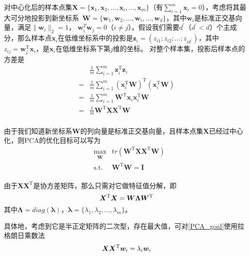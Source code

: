 \documentclass[a4paper,oneside,12pt]{book}
\begin{document}





对中心化后的样本点集$\bm{X}=\{\bm{x}_1,\bm{x}_2,\ldots,\bm{x}_i,\ldots,\bm{x}_m\}$（有$\sum_{i=1}^{m}\bm{x}_i = 0$），考虑将其最大可分地投影到新坐标系\ $\bm{W}= \{\bm{w}_1,\bm{w}_2,\ldots,\bm{w}_i,\ldots,\bm{w}_d\} $，其中$\bm{w}_i$是标准正交基向量，满足$\|\bm{w}_i\|_2 = 1$， $\bm{w}_i^T\bm{w}_j = 0$（$i \not= j$）。假设我们需要$d^\prime$（$d^\prime < d$）个主成分，那么样本点$\bm{x}_i$在低维坐标系中的投影是$\bm{z}_i = (z_{i1};z_{i2};\ldots;z_{id^\prime})$，其中$z_{ij} = \bm{w}_j^\mathrm{T}\bm{x}_i$，是$\bm{x}_i$在低维坐标系下第$j$维的坐标。
对整个样本集，投影后样本点的方差是
\begin{equation}
\begin{aligned}
    & \frac{1}{m}\sum_{i=1}^m \bm{z}_i^\mathrm{T}\bm{z}_i \\
= & \frac{1}{m}\sum_{i=1}^m (\bm{x}_i^\mathrm{T}\bm{W})^\mathrm{T}(\bm{x}_i^\mathrm{T}\bm{W}) \\
= & \frac{1}{m}\sum_{i=1}^m \bm{W}^\mathrm{T}\bm{x}_i\bm{x}_i^\mathrm{T}\bm{W} \\
= & \frac{1}{m} \bm{W}^\mathrm{T}\bm{X}\bm{X}^\mathrm{T}\bm{W} \\
\end{aligned}
\end{equation}

由于我们知道新坐标系$\bm{W}$的列向量是标准正交基向量，且样本点集$\bm{X}$已经过中心化，则PCA的优化目标可以写为
\begin{equation}
\label{PCA_goal}
\begin{aligned}
& \max_{\substack{\bm{W}}}  &  tr(\bm{W}^\mathrm{T}\bm{X}\bm{X}^ \mathrm{T}\bm{W}) \\
& \operatorname{ s.t. }  &  \bm{W}^\mathrm{T}\bm{W} = \bm{I} \\
\end{aligned}
\end{equation}

由于$\bm{X}\bm{X}^ \mathrm{ T }$是协方差矩阵，那么只需对它做特征值分解，即
\begin{equation}
\label{PCA_eigenvalue}
\bm{X}^ \mathrm{ T }\bm{X} = \bm{W}\bm{\Lambda}\bm{W}^ \mathrm{ T } \\
\end{equation}
其中$\bm{\Lambda}=diag(\bm{\lambda})$，$\bm{\lambda} = \{\lambda_1,\lambda_2,\ldots,\lambda_m\}$。

具体地，考虑到它是半正定矩阵的二次型，存在最大值，可对\eqref{PCA_goal}使用拉格朗日乘数法
\begin{equation}
\bm{X}\bm{X}^ \mathrm{ T }\bm{w}_i  = \lambda_i \bm{w}_i \\
\end{equation}
\end{document}
